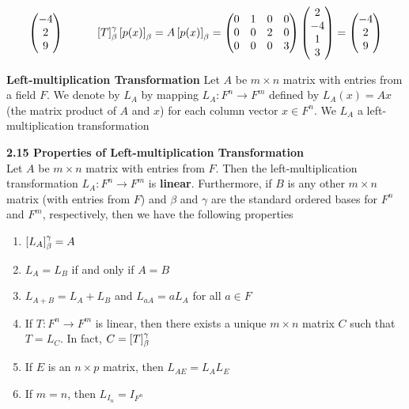 \documentclass[11pt]{article}
\begin{document}
\begin{theorem*}
\[\begin{pmatrix}
            -4 \\ 2 \\ 9
        \end{pmatrix}
        \quad \quad \quad 
        \left[ T \right]_{\beta}^{\gamma} \left[ p(x) \right]_{\beta} = A\left[ p(x) \right]_{\beta} = 
        \begin{pmatrix}
            0 & 1 & 0 & 0 \\
            0 & 0 & 2 & 0 \\
            0 & 0 & 0 & 3 \\ 
        \end{pmatrix}
        \begin{pmatrix}
            2 \\ -4 \\ 1 \\ 3 \\
        \end{pmatrix}
        = 
        \begin{pmatrix}
            -4 \\ 2 \\ 9 \\ 
        \end{pmatrix}
    \]
\end{theorem*}


\begin{defn*}
    \textbf{Left-multiplication Transformation} Let $A$ be $m\times n$ matrix with entries from a field $F$. We denote by $L_A$ by mapping $L_A:F^n \to F^m$ defined by $L_A(x) = Ax$ (the matrix product of $A$ and $x$) for each column vector $x\in F^n$. We $L_A$ a left-multiplication transformation
\end{defn*}

\begin{theorem*}
    \textbf{2.15 Properties of Left-multiplication Transformation} \\
    Let $A$ be $m\times n$ matrix with entries from $F$. Then the left-multiplication transformation $L_A: F^n \to F^m$ is \textbf{linear}. Furthermore, if $B$ is any other $m\times n$ matrix (with entries from $F$) and $\beta$ and $\gamma$ are the standard ordered bases for $F^n$ and $F^m$, respectively, then we have the following properties 
    \begin{enumerate}
        \item $\left[ L_A \right]_{\beta}^{\gamma} = A$ 
        \item $L_A = L_B$ if and only if $A=B$
        \item $L_{A+B} = L_A + L_B$ and $L_{aA} = aL_A$ for all $a\in F$
        \item If $T:F^n \to F^m$ is linear, then there exists a unique $m\times n$ matrix $C$ such that $T = L_C$. In fact, $C = \left[ T \right]_{\beta}^{\gamma}$
        \item If $E$ is an $n\times p$ matrix, then $L_{AE} = L_A L_E$
        \item If $m=n$, then $L_{I_n} = I_{F^n}$
    \end{enumerate}
\end{theorem*}
\end{document}
